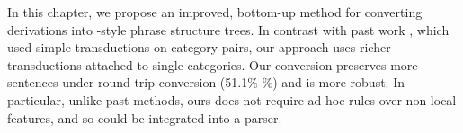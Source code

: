 
\newcommand{\old}{\candc{}-\textsc{conv}\xspace}

In this chapter, we propose an improved, bottom-up method for converting \ccg derivations into \ptb-style phrase structure trees.
In contrast with past work \parencite{Clark-Curran:2009}, which used simple transductions on category pairs, our approach uses richer transductions attached to single categories.
Our conversion preserves more sentences under round-trip conversion (51.1\% \%) and is more robust.
In particular, unlike past methods, ours does not require ad-hoc rules over non-local features, and so could be integrated into a parser.

